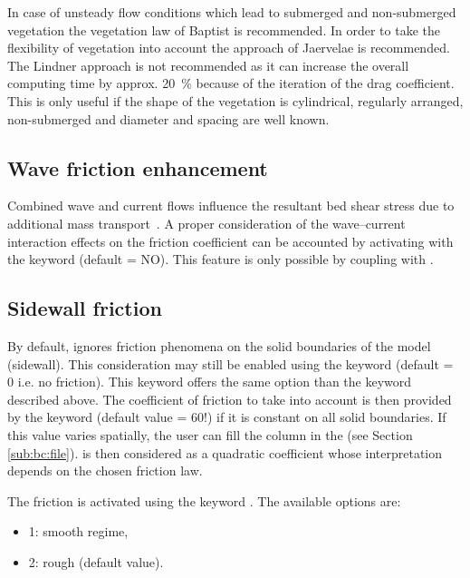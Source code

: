 In case of unsteady flow conditions which lead to 
submerged and non-submerged vegetation 
the vegetation law of Baptist is recommended. 
In order to take the flexibility of vegetation 
into account the approach of Jaervelae is recommended.
The Lindner approach is not recommended as it can increase the overall computing
time by approx. 20~\% because of the iteration of the drag coefficient. 
This is only useful if the shape of the vegetation is cylindrical, 
regularly arranged, non-submerged and 
diameter and spacing are well known.

\subsection{Wave friction enhancement}

Combined wave and current flows influence the resultant bed shear stress due to
additional mass transport~\cite{OConnorYoo1988}.
A proper consideration of the wave--current interaction effects on the friction
coefficient can be accounted by activating with the keyword
 (default = NO).
This feature is only possible by coupling  with \tomawac.


\subsection{Sidewall friction}

By default,  ignores friction phenomena on the solid boundaries
of the model (sidewall).
This consideration may still be enabled using the keyword
 (default = 0 i.e. no friction).
This keyword offers the same option than the keyword
 described above.
The coefficient of friction to take into account is then provided
by the keyword 
(default value = 60!) if it is constant on all solid boundaries.
If this value varies spatially, the user can fill the column 
in the  (see Section \ref{sub:bc:file}).
 is then considered as a quadratic coefficient whose
interpretation depends on the chosen friction law.

The friction is activated using the keyword
.
The available options are:

\begin{itemize}
\item 1: smooth regime,

\item 2: rough (default value).
\end{itemize}

